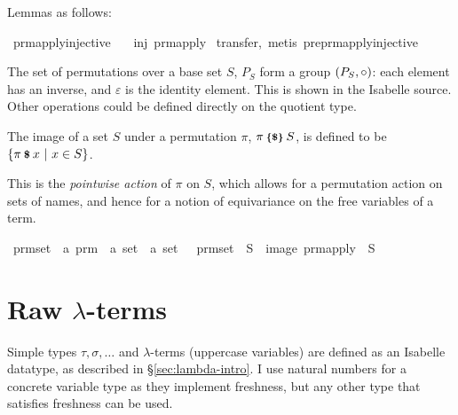 Lemmas as follows:

\begin{implementation}
\isamarkupfalse%
\ prm{\isacharunderscore}apply{\isacharunderscore}injective{\isacharcolon}\isanewline
\ \ \ {\isachardoublequoteopen}inj\ {\isacharparenleft}prm{\isacharunderscore}apply\ {\isasympi}{\isacharparenright}{\isachardoublequoteclose}\isanewline
%
\isadelimproof
%
\endisadelimproof
%
\isatagproof
{}\isamarkupfalse%
{\isacharparenleft}transfer,\ metis\ preprm{\isacharunderscore}apply{\isacharunderscore}injective{\isacharparenright}%
\endisatagproof
\end{implementation}

The set of permutations over a base set \(S\), \(P_S\) form a group \(\left(P_S, \circ\right)\): each element has an inverse, and \(\varepsilon\) is the identity element.
This is shown in the Isabelle source.
Other operations could be defined directly on the quotient type.

\begin{definition}
The image of a set \(S\) under a permutation \(\pi\), \(\pi \mathbin{\textrm{\footnotesize{\textbf{\{\$\}}}}} S\), is defined to be \(\{\pi \mathbin{\textrm{\footnotesize{\textbf{\$}}}} x\ |\ x \in S\}\).
\end{definition}

This is the \emph{pointwise action} of \(\pi\) on \(S\), which allows for a permutation action on sets of names, and hence for a notion of equivariance on the free variables of a term.

\begin{implementation}
\isamarkupfalse%
\ prm{\isacharunderscore}set\ {\isacharcolon}{\isacharcolon}\ {\isachardoublequoteopen}{\isacharprime}a\ prm\ {\isasymRightarrow}\ {\isacharprime}a\ set\ {\isasymRightarrow}\ {\isacharprime}a\ set{\isachardoublequoteclose}\ \isanewline \ \ {\isachardoublequoteopen}prm{\isacharunderscore}set\ {\isasympi}\ S\ {\isasymequiv}\ image\ {\isacharparenleft}prm{\isacharunderscore}apply\ {\isasympi}{\isacharparenright}\ S{\isachardoublequoteclose}
\end{implementation}

\section{Raw \(\lambda\)-terms}
\label{sec:raw-terms}
Simple types \(\tau, \sigma, \ldots\) and \(\lambda\)-terms (uppercase variables) are defined as an Isabelle datatype, as described in \S\ref{sec:lambda-intro}.
I use natural numbers for a concrete variable type as they implement freshness, but any other type that satisfies freshness can be used.

